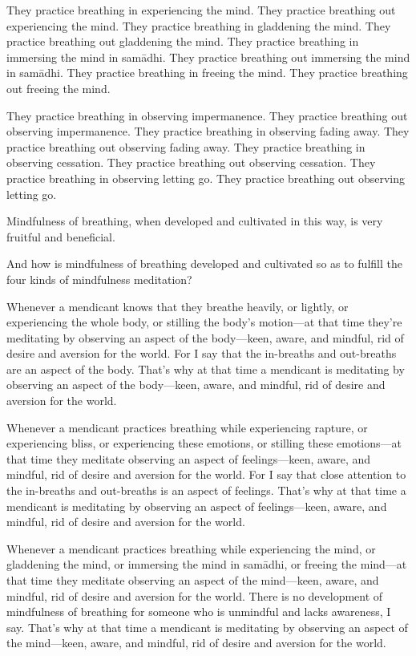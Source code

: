 \documentclass[12pt,openany]{book}%
\begin{document}
They practice breathing in experiencing the mind. They practice breathing out experiencing the mind. They practice breathing in gladdening the mind. They practice breathing out gladdening the mind. They practice breathing in immersing the mind in \textsanskrit{samādhi}. They practice breathing out immersing the mind in \textsanskrit{samādhi}. They practice breathing in freeing the mind. They practice breathing out freeing the mind. 

They practice breathing in observing impermanence. They practice breathing out observing impermanence. They practice breathing in observing fading away. They practice breathing out observing fading away. They practice breathing in observing cessation. They practice breathing out observing cessation. They practice breathing in observing letting go. They practice breathing out observing letting go. 

Mindfulness of breathing, when developed and cultivated in this way, is very fruitful and beneficial. 

And how is mindfulness of breathing developed and cultivated so as to fulfill the four kinds of mindfulness meditation? 

Whenever a mendicant knows that they breathe heavily, or lightly, or experiencing the whole body, or stilling the body’s motion—at that time they’re meditating by observing an aspect of the body—keen, aware, and mindful, rid of desire and aversion for the world. For I say that the in-breaths and out-breaths are an aspect of the body. That’s why at that time a mendicant is meditating by observing an aspect of the body—keen, aware, and mindful, rid of desire and aversion for the world. 

Whenever a mendicant practices breathing while experiencing rapture, or experiencing bliss, or experiencing these emotions, or stilling these emotions—at that time they meditate observing an aspect of feelings—keen, aware, and mindful, rid of desire and aversion for the world. For I say that close attention to the in-breaths and out-breaths is an aspect of feelings. That’s why at that time a mendicant is meditating by observing an aspect of feelings—keen, aware, and mindful, rid of desire and aversion for the world. 

Whenever a mendicant practices breathing while experiencing the mind, or gladdening the mind, or immersing the mind in \textsanskrit{samādhi}, or freeing the mind—at that time they meditate observing an aspect of the mind—keen, aware, and mindful, rid of desire and aversion for the world. There is no development of mindfulness of breathing for someone who is unmindful and lacks awareness, I say. That’s why at that time a mendicant is meditating by observing an aspect of the mind—keen, aware, and mindful, rid of desire and aversion for the world. 
\end{document}

